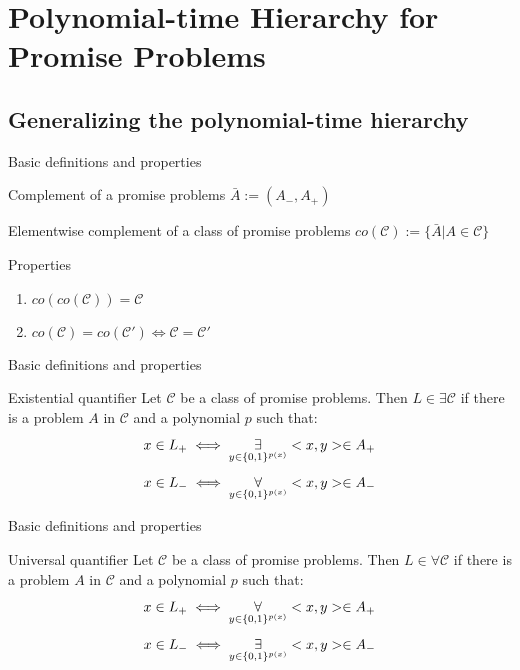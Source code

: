 \section{Polynomial-time Hierarchy for Promise Problems}
    \subsection{Generalizing the polynomial-time hierarchy}
        \begin{frame}{Basic definitions and properties}
            \begin{block}{Complement of a promise problems}
                $\bar{A} := (A_-,A_+)$
            \end{block}
            \pause
            \begin{block}{Elementwise complement of a class of promise problems}
                $co(\mathcal{C}) := \{\bar{A}| A\in \mathcal{C}\}$
            \end{block}
            \pause
            \begin{block}{Properties}
                \begin{enumerate}
                    \item $co(co(\mathcal{C})) = \mathcal{C}$
                    \item $co(\mathcal{C}) = co(\mathcal{C}') \iff \mathcal{C} = \mathcal{C}'$
                \end{enumerate}
            \end{block}
        \end{frame}
        \begin{frame}{Basic definitions and properties}
            \begin{block}{Existential quantifier}
                Let $\mathcal{C}$ be a class of promise problems. Then $L \in \exists \mathcal{C}$ if there is a problem $A$ in $\mathcal{C}$ and a polynomial $p$ such that:
                $$x\in L_+ \iff \overset{{}}{\underset{{y \in \{0,1\}^{p(x)}}}{\Large \exists}} <x,y> \in A_+$$
                $$x\in L_- \iff \overset{{}}{\underset{{y \in \{0,1\}^{p(x)}}}{\Large \forall}} <x,y> \in A_-$$
            \end{block}
        \end{frame}
        \begin{frame}{Basic definitions and properties}
            \begin{block}{Universal quantifier}
                Let $\mathcal{C}$ be a class of promise problems. Then $L \in \forall \mathcal{C}$ if there is a problem $A$ in $\mathcal{C}$ and a polynomial $p$ such that:
                $$x\in L_+ \iff \overset{{}}{\underset{{y \in \{0,1\}^{p(x)}}}{\Large \forall}} <x,y> \in A_+$$
                $$x\in L_- \iff \overset{{}}{\underset{{y \in \{0,1\}^{p(x)}}}{\Large \exists}} <x,y> \in A_-$$
            \end{block}
        \end{frame}
